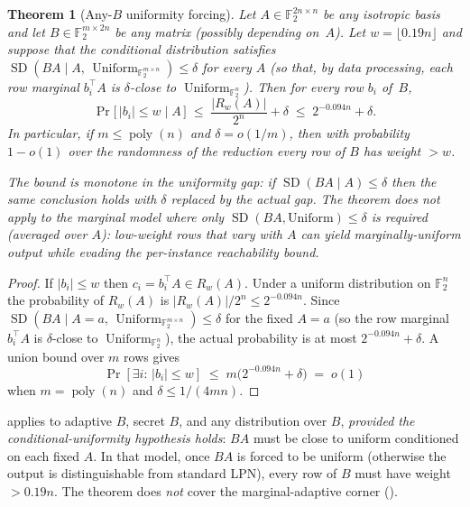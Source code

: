 \documentclass[11pt,a4paper]{article}
\theoremstyle{plain}
\newtheorem{theorem}{Theorem}[section]
\theoremstyle{definition}
\newcommand{\F}{\mathbb{F}}
\begin{document}
\begin{theorem}[Any-$B$ uniformity forcing]
\label{thm:any-b-uniformity}
Let $A\in\F_2^{2n\times n}$ be any isotropic basis and let $B\in\F_2^{m\times 2n}$ be any matrix (possibly depending on~$A$).  Let $w=\lfloor 0.19n\rfloor$ and suppose that the conditional distribution satisfies $\operatorname{SD}(BA\mid A,\,\operatorname{Uniform}_{\F_2^{m\times n}})\le\delta$ for every $A$ (so that, by data processing, each row marginal $b_i^{\top}A$ is $\delta$-close to $\operatorname{Uniform}_{\F_2^{n}}$).  Then for every row $b_i$ of~$B$,
\[
\Pr\bigl[\,|b_i|\le w \mid A\,\bigr] \;\le\; \frac{|R_w(A)|}{2^{n}} + \delta \;\le\; 2^{-0.094n}+\delta.
\]
In particular, if $m\le\operatorname{poly}(n)$ and $\delta=o(1/m)$, then with probability $1-o(1)$ over the randomness of the reduction \emph{every} row of $B$ has weight $>w$.

The bound is \emph{monotone in the uniformity gap}: if $\operatorname{SD}(BA\mid A)\le\delta$ then the same conclusion holds with $\delta$ replaced by the actual gap.  The theorem does \emph{not} apply to the marginal model where only $\operatorname{SD}(BA,\text{Uniform})\le\delta$ is required (averaged over $A$): low-weight rows that vary with $A$ can yield marginally-uniform output while evading the per-instance reachability bound.
\end{theorem}

\begin{proof}
If $|b_i|\le w$ then $c_i=b_i^{\!\top}A\in R_w(A)$.  Under a uniform distribution on $\F_2^{n}$ the probability of $R_w(A)$ is $|R_w(A)|/2^{n}\le 2^{-0.094n}$.  Since $\operatorname{SD}(BA\mid A{=}a,\,\operatorname{Uniform}_{\F_2^{m\times n}})\le\delta$ for the fixed $A=a$ (so the row marginal $b_i^{\top}A$ is $\delta$-close to $\operatorname{Uniform}_{\F_2^{n}}$), the actual probability is at most $2^{-0.094n}+\delta$.  A union bound over $m$ rows gives
\[
\Pr[\exists i:\,|b_i|\le w]\;\le\; m\bigl(2^{-0.094n}+\delta\bigr)\;=\;o(1)
\]
when $m=\operatorname{poly}(n)$ and $\delta\le 1/(4mn)$.
\end{proof}

 applies to adaptive $B$, secret $B$, and any distribution over $B$, \emph{provided the conditional-uniformity hypothesis holds}: $BA$ must be close to uniform conditioned on each fixed $A$. In that model, once $BA$ is forced to be uniform (otherwise the output is distinguishable from standard LPN), every row of $B$ must have weight $>0.19n$. The theorem does \emph{not} cover the marginal-adaptive corner ().
\end{document}
